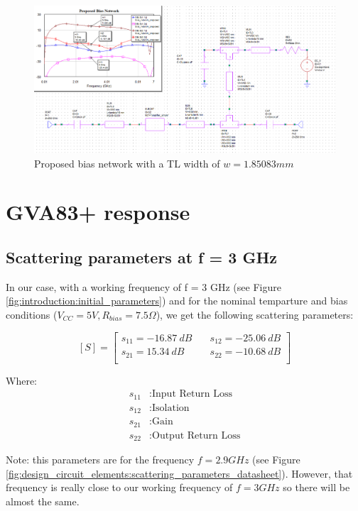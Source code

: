 \documentclass[12pt]{report} %
\begin{document}
\begin{figure}[htbp]
    \centering
    \includegraphics[width=1\linewidth]{images//design_circuit_elements/gva83+_bias_transmission_line_low_z_0.png}
    \caption{Proposed bias network with a TL width of $w = 1.85083 mm$}
    \label{fig:design_circuit_elements:gva83+_bias_transmission_line_low_z_0}
\end{figure}

\section{GVA83+ response}
 
\subsection{Scattering parameters at f = 3 GHz}

In our case, with a working frequency of f = 3 GHz (see Figure \ref{fig:introduction:initial_parameters}) and for the nominal temparture and bias conditions ($V_{CC} = 5V, R_{bias} = 7.5 \Omega$), we get the following scattering parameters:

\[
[S] = \begin{bmatrix}
s_{11} = -16.87 \ dB & \quad s_{12} = -25.06 \ dB \\
s_{21} = 15.34 \ dB & \quad s_{22} = -10.68 \ dB \\
\end{bmatrix}
\]

Where:
\begin{align*}
s_{11} & : \text{Input Return Loss} \\
s_{12} & : \text{Isolation} \\
s_{21} & : \text{Gain} \\
s_{22} & : \text{Output Return Loss}
\end{align*}

Note: this parameters are for the frequency $f = 2.9 GHz$ (see Figure \ref{fig:design_circuit_elements:scattering_parameters_datasheet}). However, that frequency is really close to our working frequency of $f = 3 GHz$ so there will be almost the same.
\end{document}
